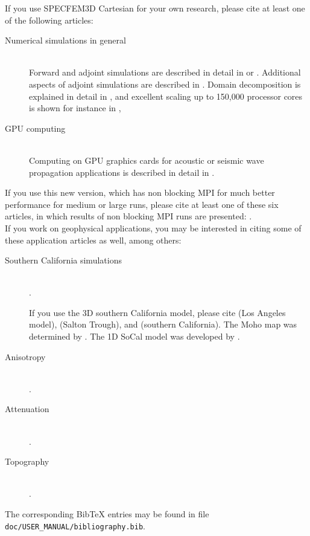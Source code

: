 If you use SPECFEM3D Cartesian for your own research, please cite
at least one of the following articles:
\begin{description}
\item [{Numerical simulations in general}] ~\\
 Forward and adjoint simulations are described in detail in \citet{TrKoLi08,PeKoLuMaLeCaLeMaLiBlNiBaTr11,VaCaSaKoVi99,KoMiEr09,KoErGoMi10,ChKoViCaVaFe07,MaKoDi09,KoViCh10,CaKoLaTiMiLeSnTr08,TrKoHjLiZhPeBoMcFrTrHu10,KoRiTr02,KoTr02a,KoTr02b,KoTr99}
or \citet{KoVi98}. Additional aspects of adjoint simulations are
described in \citet{TrTaLi05,LiTr06,TrKoLi08,LiTr08,TrKoHjLiZhPeBoMcFrTrHu10,PeKoLuMaLeCaLeMaLiBlNiBaTr11}.
Domain decomposition is explained in detail in \citet{MaKoBlLe08},
and excellent scaling up to 150,000 processor cores is shown for instance
in \citet{CaKoLaTiMiLeSnTr08,KoLaMi08a,MaKoBlLe08,KoErGoMi10,Kom11},
\item [{GPU computing}] ~\\
 Computing on GPU graphics cards for acoustic or seismic wave propagation
applications is described in detail in \citet{Kom11,MiKo10,KoMiEr09,KoErGoMi10}.
\end{description}
\noindent If you use this new version, which has non blocking
MPI for much better performance for medium or large runs, please cite
at least one of these six articles, in which results of non blocking
MPI runs are presented: \citet{PeKoLuMaLeCaLeMaLiBlNiBaTr11,KoErGoMi10,KoViCh10,Kom11,CaKoLaTiMiLeSnTr08,MaKoBlLe08}.\\


\noindent If you work on geophysical applications, you may be interested
in citing some of these application articles as well, among others:
\begin{description}
\item [{Southern California simulations}] ~\\
 \citet{KoLiTrSuStSh04,KrJiKoTr06a,KrJiKoTr06b}.


If you use the 3D southern California model, please cite \citet{SuSh03}
(Los Angeles model), \citet{lovelyetal06} (Salton Trough), and \citet{hauksson2000}
(southern California). The Moho map was determined by \citet{zhukanamori2000}.
The 1D SoCal model was developed by \citet{DrHe90}.

\item [{Anisotropy}] ~\\
 \citet{ChTr07,JiTsKoTr05,ChFaKo04,FaChKo04,RiRiKoTrHe02,TrKo00}.
\item [{Attenuation}] ~\\
 \citet{SaKoTr10,KoTr02a,KoTr99}.
\item [{Topography}] ~\\
 \citet{LeKoHuTr09,LeChKoHuTr09,LeChLiKoHuTr08,GoAmTaCaSmSaMaKo09,WiKoScTr04}.
\end{description}
The corresponding Bib\TeX{} entries may be found in file \texttt{doc/USER\_MANUAL/bibliography.bib}.


